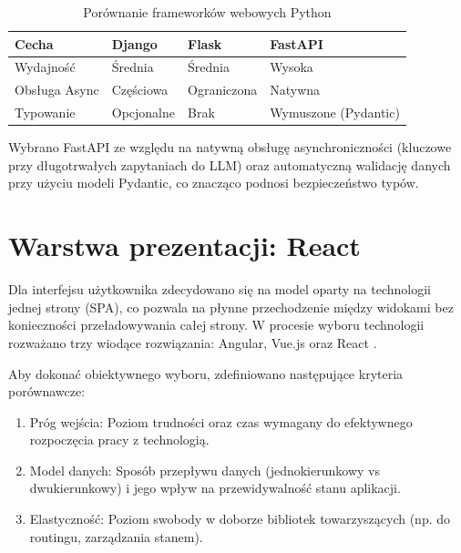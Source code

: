 \begin{table}[H]
    \centering
    \begin{tabular}{|l|l|l|l|}
        \hline
        \textbf{Cecha} & \textbf{Django} & \textbf{Flask} & \textbf{FastAPI}     \\
        \hline
        Wydajność      & Średnia         & Średnia        & Wysoka               \\
        \hline
        Obsługa Async  & Częściowa       & Ograniczona    & Natywna              \\
        \hline
        Typowanie      & Opcjonalne      & Brak           & Wymuszone (Pydantic) \\
        \hline
    \end{tabular}
    \caption{Porównanie frameworków webowych Python}
    \label{tab:frameworks_comparison}
\end{table}

Wybrano FastAPI ze względu na natywną obsługę asynchroniczności (kluczowe przy długotrwałych zapytaniach do \gls{LLM}) oraz automatyczną walidację danych przy użyciu modeli Pydantic, co znacząco podnosi bezpieczeństwo typów.

\section*{Warstwa prezentacji: React}
Dla interfejsu użytkownika zdecydowano się na model oparty na technologii jednej strony (\gls{SPA})\cite{spa}, co pozwala na płynne przechodzenie między widokami bez konieczności przeładowywania całej strony. W procesie wyboru technologii rozważano trzy wiodące rozwiązania: Angular\cite{angular}, Vue.js\cite{vuejs} oraz React \cite{react}.

Aby dokonać obiektywnego wyboru, zdefiniowano następujące kryteria porównawcze:
\begin{enumerate}
    \item Próg wejścia: Poziom trudności oraz czas wymagany do efektywnego rozpoczęcia pracy z technologią.
    \item Model danych: Sposób przepływu danych (jednokierunkowy vs dwukierunkowy) i jego wpływ na przewidywalność stanu aplikacji.
    \item Elastyczność: Poziom swobody w doborze bibliotek towarzyszących (np. do routingu, zarządzania stanem).
\end{enumerate}

